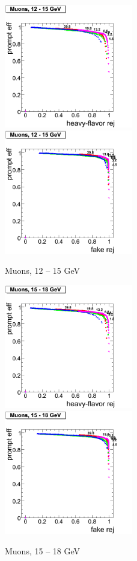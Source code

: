 \begin{figure}[htbp]
   \includegraphics[width = 0.5\textwidth]{pictures/bkgdRej_sigEff/muon_nonPrompt_ptCut3_ptCut4.png}
   \includegraphics[width = 0.5\textwidth]{pictures/bkgdRej_sigEff/muon_fake_ptCut3_ptCut4.png}
   \caption{Muons, 12 -- 15 GeV}
   \label{fig:muon_ptCut3_ptCut4}
\end{figure}

\begin{figure}[htbp]
   \includegraphics[width = 0.5\textwidth]{pictures/bkgdRej_sigEff/muon_nonPrompt_ptCut4_ptCut5.png}
   \includegraphics[width = 0.5\textwidth]{pictures/bkgdRej_sigEff/muon_fake_ptCut4_ptCut5.png}
   \caption{Muons, 15 -- 18 GeV}
   \label{fig:muon_ptCut4_ptCut5}
\end{figure}


